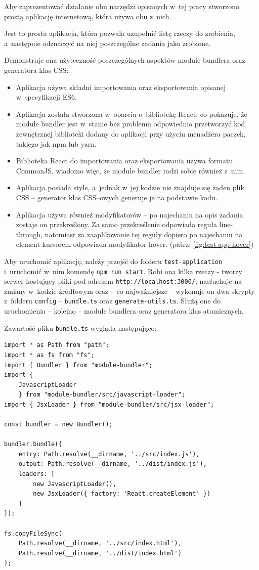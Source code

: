 \documentclass{SGGW-thesis}
\begin{document}
Aby zaprezentować działanie obu narzędzi opisanych w~tej pracy stworzono prostą aplikację internetową, która używa obu z~nich.

Jest to prosta aplikacja, która pozwala uzupełnić listę rzeczy do zrobienia, a~następnie odznaczyć na niej poszczególne zadania jako zrobione.

Demonstruje ona użyteczność poszczególnych aspektów module bundlera oraz generatora klas CSS:
\begin{itemize}
    \item Aplikacja używa składni importowania oraz eksportowania opisanej w~specyfikacji ES6.
    \item Aplikacja została stworzona w~oparciu o~bibliotekę React, co pokazuje, że module bundler jest w~stanie bez problemu odpowiednio przetworzyć kod zewnętrznej biblioteki dodany do aplikacji przy użyciu menadżera paczek, takiego jak npm lub yarn.
    \item Biblioteka React do importowania oraz eksportowania używa formatu CommonJS, wiadomo więc, że module bundler radzi sobie również z~nim.
    \item Aplikacja posiada style, a~jednak w~jej kodzie nie znajduje się żaden plik CSS -- generator klas CSS--owych generuje je na podstawie kodu.
    \item Aplikacja używa również modyfikatorów -- po najechaniu na opis zadania zostaje on przekreślony. Za samo przekreślenie odpowiada reguła line-through, natomiast za zaaplikowanie tej reguły dopiero po najechaniu na element kursorem odpowiada modyfikator hover. (patrz: \ref{fig:test-app-hover})
\end{itemize}

Aby uruchomić aplikację, należy przejść do folderu \verb|test-application| i~uruchomić w~nim komendę \verb|npm run start|. Robi ona kilka rzeczy - tworzy serwer hostujący pliki pod adresem \verb|http://localhost:3000/|, nasłuchuje na zmiany w~kodzie źródłowym oraz -- co najważniejsze -- wykonuje on dwa skrypty z~folderu \verb|config| -- \verb|bundle.ts| oraz \verb|generate-utils.ts|. Służą one do uruchomienia -- kolejno -- module bundlera oraz generatora klas atomicznych.

Zawartość pliku \verb|bundle.ts| wygląda następująco:

\begin{verbatim}
import * as Path from "path";
import * as fs from "fs";
import { Bundler } from "module-bundler";
import {
    JavascriptLoader
    } from "module-bundler/src/javascript-loader";
import { JsxLoader } from "module-bundler/src/jsx-loader";

const bundler = new Bundler();

bundler.bundle({
    entry: Path.resolve(__dirname, '../src/index.js'),
    output: Path.resolve(__dirname, '../dist/index.js'),
    loaders: [
        new JavascriptLoader(),
        new JsxLoader({ factory: 'React.createElement' })
    ]
});

fs.copyFileSync(
    Path.resolve(__dirname, '../src/index.html'),
    Path.resolve(__dirname, '../dist/index.html')
);
\end{verbatim}
\end{document}
